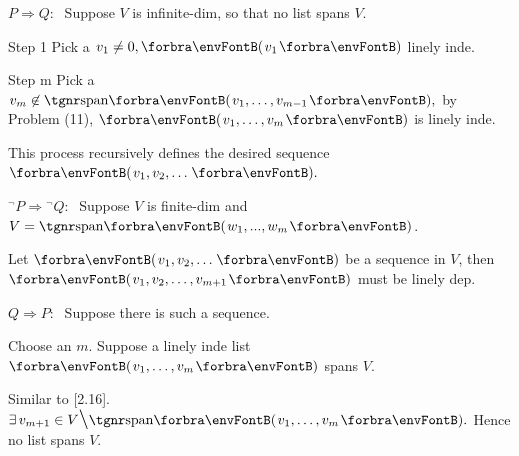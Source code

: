 \par\quad
$P\Rightarrow Q:\;$ Suppose $V$ is infinite-dim, so that no list spans $V$.\par\quad
{} {\tgbf Step 1}\;\; Pick a $v_1\neq 0,\Par{v_1}$ linely inde.\par\quad
{} {\tgbf Step m}\; Pick a $v_m\not\in\Span{v_1,\dots,v_{m-1}},$ by Problem (11), $\Par{v_1,\dots,v_m}$ is linely inde.\par\quad
{} This process recursively defines the desired sequence $\Par{v_1,v_2,\dots}.$\vspace{4pt}\par\quad
${}^\neg P\Rightarrow{}^\neg Q:\;$ Suppose $V$ is finite-dim and $V=\Span{w_1 , ..., w_m}$.\par\quad
{} Let $\Par{v_1 , v_2 , \dots}$ be a sequence in $V$, then $\Par{v_1,v_2,\dots,v_{m+1}}$ must be linely dep.\vspace{4pt}\par\quad
\Or\; $Q\Rightarrow P:\;$ Suppose there is such a sequence.\par\quad
{} Choose an $m$. Suppose a linely inde list $\Par{v_1,\dots,v_m}$ spans $V$.\par\quad
{} Similar to [2.16]. $\exists\,v_{m+1}\in V\Backslash\Span{v_1,\dots,v_m}.$ Hence no list spans $V.$\PfEnd
\SepLine

